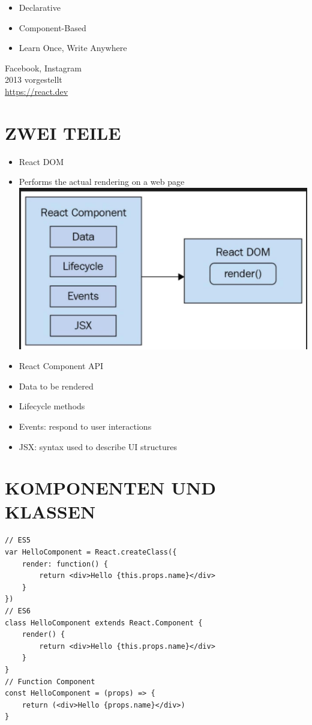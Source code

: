 \documentclass[10pt]{article}
\begin{document}
\begin{itemize}
  \item Declarative
  \item Component-Based
  \item Learn Once, Write Anywhere
\end{itemize}

Facebook, Instagram\\
2013 vorgestellt\\
\href{https://react.dev}{https://react.dev}

\section*{ZWEI TEILE}
\begin{itemize}
  \item React DOM
  \item Performs the actual rendering on a web page\\
\includegraphics[max width=\textwidth, center]{2025_01_02_68113d8fd21152cab1dbg-06}
  \item React Component API
  \item Data to be rendered
  \item Lifecycle methods
  \item Events: respond to user interactions
  \item JSX: syntax used to describe UI structures
\end{itemize}

\section*{KOMPONENTEN UND KLASSEN}
\begin{verbatim}
// ES5
var HelloComponent = React.createClass({
    render: function() {
        return <div>Hello {this.props.name}</div>
    }
})
// ES6
class HelloComponent extends React.Component {
    render() {
        return <div>Hello {this.props.name}</div>
    }
}
// Function Component
const HelloComponent = (props) => {
    return (<div>Hello {props.name}</div>)
}
\end{verbatim}
\end{document}

